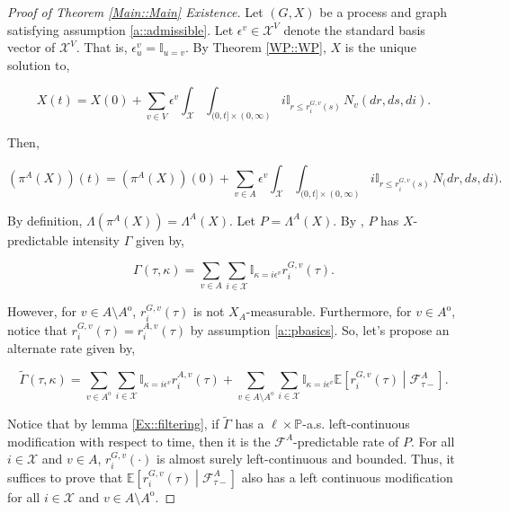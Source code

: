 \documentclass[12pt]{article}
\newcommand{\mb}{\mathbb}
\newcommand{\mc}{\mathcal}
\newcommand{\ep}{\epsilon}
\newcommand{\pr}{\mb{P}}							%
\newcommand{\ex}[1]{\mb{E}\left[#1\right]}			%
\newcommand{\sta}{\mc{X}}							%
\newcommand{\Xf}{X}									%
\newcommand{\poiss}{N}								%
\newcommand{\Sm}{\ell}								%
\newcommand{\rate}{r}								%
\newcommand{\F}{\mc{F}}								%
\newcommand{\proj}{\pi}								%
\newcommand{\poissv}[1]{_{#1}}						%
\newcommand{\vind}[1]{_{#1}}						%
\newcommand{\tme}[1]{(#1)}							%
\newcommand{\vpara}[1]{^{#1}}						%
\newcommand{\stpara}[1]{_{#1}}						%
\newcommand{\tpara}[1]{_{#1}}						%
\newcommand{\gvpara}[2]{^{#1,#2}}					%
\newcommand{\inte}[1]{{#1}^\mathrm{o}}
\newcommand{\alt}[1]{\tilde{#1}}
\newcommand{\pmap}{\Lambda}
\newcommand{\rt}{\tau}
\renewcommand{\mark}{\kappa}
\newcommand{\ratee}{\Gamma}
\newcommand{\rp}{P}
\newcommand{\ev}[1]{\ep^{#1}}						%
\begin{document}
\begin{proof}[Proof of Theorem \ref{Main::Main} Existence]

Let \((G,\Xf)\) be a process and graph satisfying assumption \ref{a::admissible}. Let \(\ev{v} \in \sta^V\) denote the standard basis vector of \(\sta^V\). That is, \(\ev{v}\vind{u} = \mb{I}_{u=v}\). By Theorem \ref{WP::WP}, \(\Xf\) is the unique solution to,

\[\Xf\tme{t} = \Xf\tme{0} + \sum_{v \in V}\ev{v}\int_\sta\int_{(0,t]\times (0,\infty)} i\mb{I}_{r \leq \rate\gvpara{G}{v}\stpara{i}\tme{s}}\,\poiss\poissv{v}(dr,ds,di).\]

Then,

\[\left(\proj\vpara{A}(\Xf)\right)\tme{t} = \left(\proj\vpara{A}(\Xf)\right)\tme{0} + \sum_{v\in A}\ev{v}\int_\sta\int_{(0,t]\times (0,\infty)} i\mb{I}_{r \leq \rate\gvpara{G}{v}\stpara{i}\tme{s}}\,\poiss\poissv(dr,ds,di).\]

By definition, \(\pmap\left(\proj\vpara{A}(\Xf)\right) = \pmap\vpara{A}(\Xf)\). Let \(\rp = \pmap\vpara{A}(\Xf)\). By \cite[Exercise 14.7.1]{DalVer08}, \(\rp\) has \(\Xf\)-predictable intensity \(\ratee\) given by,

\[\ratee(\rt,\mark) = \sum_{v \in A} \sum_{i \in \sta} \mb{I}_{\mark = i\ev{v}} \rate\gvpara{G}{v}\stpara{i}\tme{\rt}.\]

However, for \(v \in A\setminus \inte{A}\), \(\rate\gvpara{G}{v}\stpara{i}\tme{\rt}\) is not \(\Xf\vind{A}\)-measurable. Furthermore, for \(v \in \inte{A}\), notice that \(\rate\gvpara{G}{v}\stpara{i}\tme{\rt} = \rate\gvpara{A}{v}\stpara{i}\tme{\rt}\) by assumption \ref{a::pbasics}. So, let's propose an alternate rate given by,

\begin{equation}
\alt{\ratee}(\rt,\mark) = \sum_{v \in \inte{A}}\sum_{i\in \sta} \mb{I}_{\mark = i\ev{v}}\rate\gvpara{A}{v}\stpara{i}\tme{\rt} + \sum_{v \in A\setminus \inte{A}}\sum_{i \in \sta} \mb{I}_{\mark = i\ev{v}}\ex{\rate\gvpara{G}{v}\stpara{i}\tme{\rt}\middle|\F\vpara{A}\tpara{\rt-}}.
\label{Ex::tempfiltrate}
\end{equation}

Notice that by lemma \ref{Ex::filtering}, if \(\alt{\ratee}\) has a \(\Sm\times \pr\)-a.s. left-continuous modification with respect to time, then it is the \(\F\vpara{A}\)-predictable rate of \(\rp\). For all \(i\in\sta\) and \(v \in A\), \(\rate\gvpara{G}{v}\stpara{i}\tme{\cdot}\) is almost surely left-continuous and bounded. Thus, it suffices to prove that \(\ex{\rate\gvpara{G}{v}\stpara{i}(\rt)\middle|\F\vpara{A}\tpara{\rt-}}\) also has a left continuous modification for all \(i\in \sta\) and \(v \in A\setminus\inte{A}\).


\end{proof}
\end{document}

